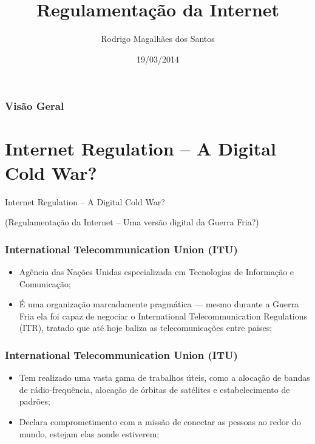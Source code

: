 \documentclass{beamer}
\title[Regulamentação da Internet]{Regulamentação da Internet} %
\author{Rodrigo Magalhães dos Santos} %
\institute[IPT] %
{
Instituto de Pesquisas Tecnológicas \\ Universidade de São Paulo \\ %
\medskip
\textit{rmagalhaes85@gmail.com} %
}
\date{19/03/2014}
\begin{document}
\begin{frame}
\titlepage %
\end{frame}

\begin{frame}
\frametitle{Visão Geral}
\tableofcontents 
\end{frame}


\section{Internet Regulation -- A Digital Cold War?} 

\begin{frame}
\huge{\centerline{Internet Regulation -- A Digital Cold War?}}
\normalsize{\centerline{(Regulamentação da Internet -- Uma versão digital da Guerra Fria?)}}
\end{frame}


\begin{frame}
\frametitle{International Telecommunication Union (ITU)}
\begin{itemize}
\item Agência das Nações Unidas especializada em Tecnologias de Informação e Comunicação;
\item É uma organização marcadamente pragmática --- mesmo durante a Guerra Fria ela foi capaz de negociar o International Telecommunication Regulations (ITR), tratado que até hoje baliza as telecomunicações entre paises;
\end{itemize}
\end{frame}


\begin{frame}
\frametitle{International Telecommunication Union (ITU)}
\begin{itemize}
\item Tem realizado uma vasta gama de trabalhos úteis, como a alocação  de bandas de rádio-frequência, alocação de órbitas de satélites e estabelecimento de padrões;
\item Declara comprometimento com a missão de conectar as pessoas ao redor do mundo, estejam elas aonde estiverem;
\end{itemize}
\end{frame}
\end{document}
